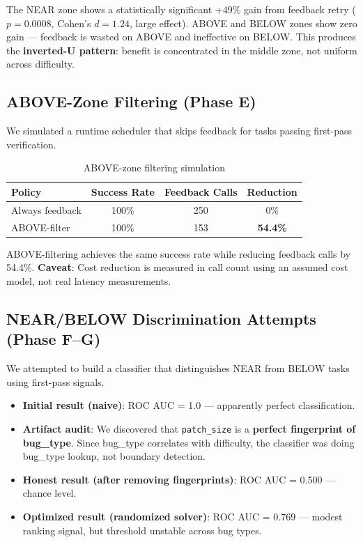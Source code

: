 \documentclass[11pt,a4paper]{article}
\begin{document}
The NEAR zone shows a statistically significant +49\% gain from feedback retry ($p = 0.0008$, Cohen's $d = 1.24$, large effect). ABOVE and BELOW zones show zero gain --- feedback is wasted on ABOVE and ineffective on BELOW. This produces the \textbf{inverted-U pattern}: benefit is concentrated in the middle zone, not uniform across difficulty.

\subsection{ABOVE-Zone Filtering (Phase E)}

We simulated a runtime scheduler that skips feedback for tasks passing first-pass verification.

\begin{table}[h]
\centering
\begin{tabular}{lccc}
\toprule
\textbf{Policy} & \textbf{Success Rate} & \textbf{Feedback Calls} & \textbf{Reduction} \\
\midrule
Always feedback & 100\% & 250 & 0\% \\
ABOVE-filter & 100\% & 153 & \textbf{54.4\%} \\
\bottomrule
\end{tabular}
\caption{ABOVE-zone filtering simulation}
\label{tab:phase_e}
\end{table}

ABOVE-filtering achieves the same success rate while reducing feedback calls by 54.4\%. \textbf{Caveat}: Cost reduction is measured in call count using an assumed cost model, not real latency measurements.

\subsection{NEAR/BELOW Discrimination Attempts (Phase F--G)}

We attempted to build a classifier that distinguishes NEAR from BELOW tasks using first-pass signals.

\begin{itemize}
    \item \textbf{Initial result (naive)}: ROC AUC = 1.0 --- apparently perfect classification.
    \item \textbf{Artifact audit}: We discovered that \texttt{patch\_size} is a \textbf{perfect fingerprint of bug\_type}. Since bug\_type correlates with difficulty, the classifier was doing bug\_type lookup, not boundary detection.
    \item \textbf{Honest result (after removing fingerprints)}: ROC AUC = 0.500 --- chance level.
    \item \textbf{Optimized result (randomized solver)}: ROC AUC = 0.769 --- modest ranking signal, but threshold unstable across bug types.
\end{itemize}
\end{document}
